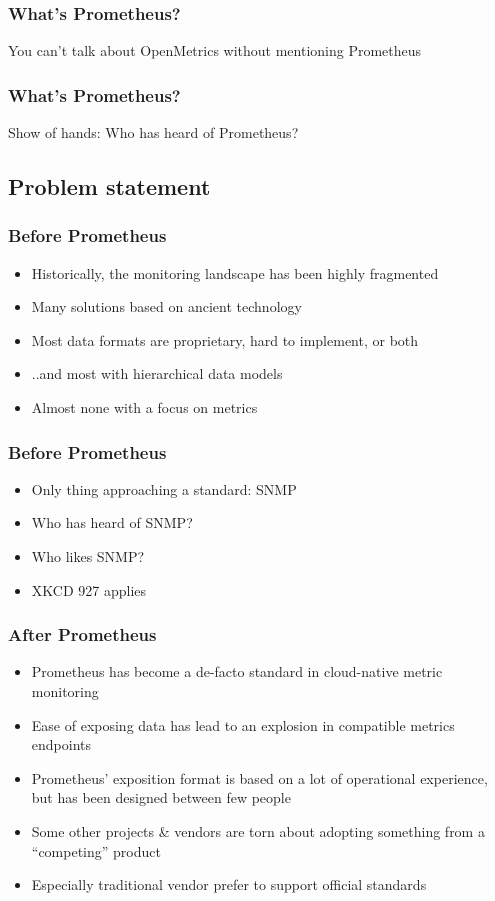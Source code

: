 \documentclass[aspectratio=169]{beamer}
\begin{document}
\begin{frame}
	\frametitle{What's Prometheus?}
		\begin{center}
			\vfill
			You can't talk about OpenMetrics without mentioning Prometheus
			\vfill
		\end{center}
\end{frame}

\begin{frame}
	\frametitle{What's Prometheus?}
		\begin{center}
			\vfill
			Show of hands: Who has heard of Prometheus?
			\vfill
		\end{center}
\end{frame}

\subsection{Problem statement}

\begin{frame}
	\frametitle{Before Prometheus}
	\vfill
	\begin{itemize}
		\item Historically, the monitoring landscape has been highly fragmented
		\item Many solutions based on ancient technology
		\item Most data formats are proprietary, hard to implement, or both
		\item ..and most with hierarchical data models
		\item Almost none with a focus on metrics
	\end{itemize}
	\vfill
\end{frame}

\begin{frame}
	\frametitle{Before Prometheus}
	\vfill
	\begin{itemize}
		\item Only thing approaching a standard: SNMP
		\item Who has heard of SNMP?
		\item Who likes SNMP?
		\item XKCD 927 applies
	\end{itemize}
	\vfill
\end{frame}

\begin{frame}
	\frametitle{After Prometheus}
	\vfill
	\begin{itemize}
		\item Prometheus has become a de-facto standard in cloud-native metric monitoring
		\item Ease of exposing data has lead to an explosion in compatible metrics endpoints
		\item Prometheus’ exposition format is based on a lot of operational experience, but has been designed between few people
		\item Some other projects \& vendors are torn about adopting something from a “competing” product
		\item Especially traditional vendor prefer to support official standards
	\end{itemize}
	\vfill
\end{frame}
\end{document}
